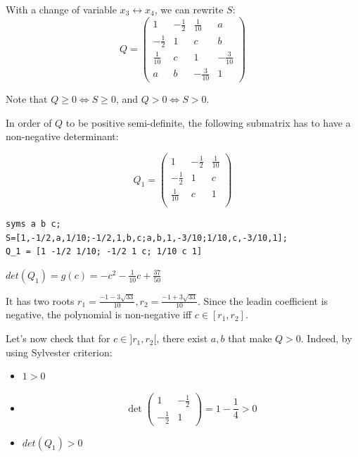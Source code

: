 \documentclass[11pt]{article}
\begin{document}
With a change of variable \(x_3 \leftrightarrow x_4\), we can rewrite \(S\):
\[Q = \begin{pmatrix}
 1          & -\frac12 &  \frac1{10}  & a\\
 -\frac12   & 1        &  c           & b\\
 \frac1{10} & c & 1 & -\frac3{10}\\
 a          & b        &  -\frac3{10} & 1
\end{pmatrix}\]

Note that \(Q \ge 0 \iff S \ge 0\), and \(Q > 0 \iff S > 0\).

In order of \(Q\) to be positive semi-definite, the following submatrix has to have a non-negative determinant:

\[  Q_1 = \begin{pmatrix}
 1          & -\frac12 &             \frac1{10}  \\
 -\frac12   & 1        &             c           \\
 \frac1{10} & c        &  1           \\
\end{pmatrix}\]

\begin{verbatim}
syms a b c;
S=[1,-1/2,a,1/10;-1/2,1,b,c;a,b,1,-3/10;1/10,c,-3/10,1];
Q_1 = [1 -1/2 1/10; -1/2 1 c; 1/10 c 1]
\end{verbatim}


\(det(Q_1) = g(c) = - c^2 - \frac1{10}c + \frac{37}{50}\)

It has two roots \(r_1 = \frac{-1 - 3\sqrt{33}}{10}, r_2 = \frac{-1 + 3\sqrt{33}}{10}\). Since the leadin coefficient is negative, the polynomial is non-negative iff \(c \in [r_1, r_2]\).

Let's now check that for \(c \in ]r_1, r_2[\), there exist \(a, b\) that make \(Q > 0\).
Indeed, by using Sylvester criterion:

\begin{itemize}
\item \(1 > 0\)
\item \[\det\begin{pmatrix}1&-\frac12\\-\frac12&1\end{pmatrix} = 1 - \frac14 > 0\]
\item \(det(Q_1) > 0\)
\end{itemize}
\end{document}
